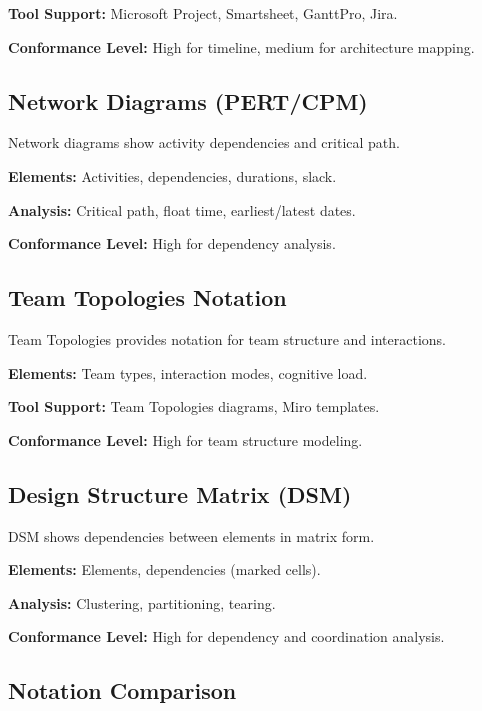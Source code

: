 \documentclass[11pt,letterpaper]{article}
\begin{document}
\textbf{Tool Support:} Microsoft Project, Smartsheet, GanttPro, Jira.

\textbf{Conformance Level:} High for timeline, medium for architecture mapping.

\subsection{Network Diagrams (PERT/CPM)}

Network diagrams show activity dependencies and critical path.

\textbf{Elements:} Activities, dependencies, durations, slack.

\textbf{Analysis:} Critical path, float time, earliest/latest dates.

\textbf{Conformance Level:} High for dependency analysis.

\subsection{Team Topologies Notation}

Team Topologies provides notation for team structure and interactions.

\textbf{Elements:} Team types, interaction modes, cognitive load.

\textbf{Tool Support:} Team Topologies diagrams, Miro templates.

\textbf{Conformance Level:} High for team structure modeling.

\subsection{Design Structure Matrix (DSM)}

DSM shows dependencies between elements in matrix form.

\textbf{Elements:} Elements, dependencies (marked cells).

\textbf{Analysis:} Clustering, partitioning, tearing.

\textbf{Conformance Level:} High for dependency and coordination analysis.

\subsection{Notation Comparison}
\end{document}
